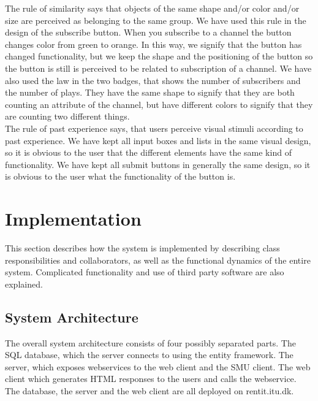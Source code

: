\documentclass[a4paper,11pt,report]{article}
\begin{document}
The rule of similarity says that objects of the same shape and/or color and/or size are perceived as belonging to the same group. We have used this rule in the design of the subscribe button. When you subscribe to a channel the button changes color from green to orange. In this way, we signify that the button has changed functionality, but we keep the shape and the positioning of the button so the button is still is perceived to be related to subscription of a channel. We have also used the law in the two badges, that shows the number of subscribers and the number of plays. They have the same shape to signify that they are both counting an attribute of the channel, but have different colors to signify that they are counting two different things. \\

The rule of past experience says, that users perceive visual stimuli according to past experience. We have kept all input boxes and lists in the same visual design, so it is obvious to the user that the different elements have the same kind of functionality. We have kept all submit buttons in generally the same design, so it is obvious to the user what the functionality of the button is. \\ 

\section{Implementation}
This section describes how the system is implemented by describing class responsibilities and collaborators, as well as the functional dynamics of the entire system. Complicated functionality and use of third party software are also explained.

\subsection{System Architecture}
The overall system architecture consists of four possibly separated parts. The SQL database, which the server connects to using the entity framework. The server, which exposes webservices to the web client and the SMU client. The web client which generates HTML responses to the users and calls the webservice. The database, the server and the web client are all deployed on rentit.itu.dk.
\end{document}
